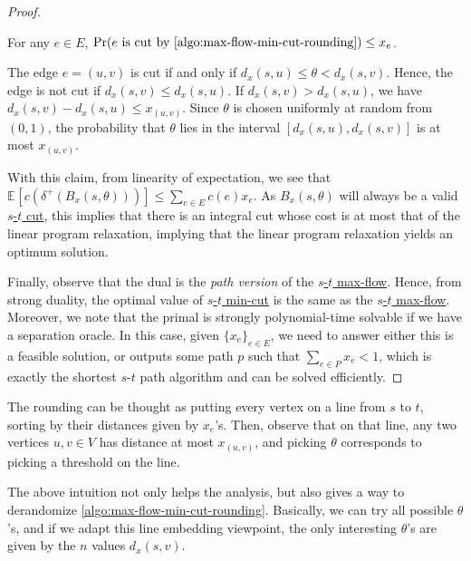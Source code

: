 \begin{proof}
	\begin{claim}
		For any \(e \in E\), \(\Pr(e \text{ is cut by \autoref{algo:max-flow-min-cut-rounding}} ) \leq x_e\).
	\end{claim}
	\begin{explanation}
		The edge \(e = (u, v)\) is cut if and only if \(d_x(s, u) \leq \theta < d_x(s, v)\). Hence, the edge is not cut if \(d_x(s, v) \leq d_x(s, u)\). If \(d_x(s, v) > d_x(s, u)\), we have \(d_x(s, v) - d_x(s, u) \leq x_{(u, v)}\). Since \(\theta \) is chosen uniformly at random from \((0, 1)\), the probability that \(\theta \) lies in the interval \([d_x(s, u), d_x(s, v)]\) is at most \(x_{(u, v)}\).
	\end{explanation}

	With this claim, from linearity of expectation, we see that \(\mathbb{E}_{}[c(\delta ^+(B_x(s, \theta )))] \leq \sum_{e \in E} c(e) x_e\). As \(B_x(s, \theta )\) will always be a valid \hyperref[prb:s-t-min-cut]{\(s\)-\(t\) cut}, this implies that there is an integral cut whose cost is at most that of the linear program relaxation, implying that the linear program relaxation yields an optimum solution.

	Finally, observe that the dual is the \emph{path version} of the \hyperref[prb:s-t-max-flow]{\(s\)-\(t\) max-flow}. Hence, from strong duality, the optimal value of \hyperref[prb:s-t-min-cut]{\(s\)-\(t\) min-cut} is the same as the \hyperref[prb:s-t-max-flow]{\(s\)-\(t\) max-flow}. Moreover, we note that the primal is strongly polynomial-time solvable if we have a separation oracle. In this case, given \(\{ x_e \} _{e\in E}\), we need to answer either this is a feasible solution, or outputs some path \(p\) such that \(\sum_{e \in P} x_e < 1\), which is exactly the shortest \(s\)-\(t\) path algorithm and can be solved efficiently.
\end{proof}

\begin{intuition}
	The rounding can be thought as putting every vertex on a line from \(s\) to \(t\), sorting by their distances given by \(x_e\)'s. Then, observe that on that line, any two vertices \(u, v \in V\) has distance at most \(x_{(u, v)}\), and picking \(\theta \) corresponds to picking a threshold on the line.
\end{intuition}

The above intuition not only helps the analysis, but also gives a way to derandomize \autoref{algo:max-flow-min-cut-rounding}. Basically, we can try all possible \(\theta \)'s, and if we adapt this line embedding viewpoint, the only interesting \(\theta \)'s are given by the \(n\) values \(d_x(s, v)\).

